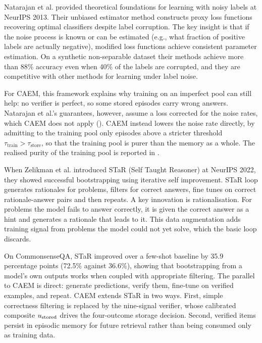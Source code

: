 Natarajan et al. \cite{natarajan2013learning} provided theoretical foundations for learning with noisy labels at NeurIPS 2013. Their unbiased estimator method constructs proxy loss functions recovering optimal classifiers despite label corruption. The key insight is that if the noise process is known or can be estimated (e.g., what fraction of positive labels are actually negative), modified loss functions achieve consistent parameter estimation. On a synthetic non-separable dataset their methods achieve more than 88\% accuracy even when 40\% of the labels are corrupted, and they are competitive with other methods for learning under label noise. 

For CAEM, this framework explains why training on an imperfect pool can still help: no verifier is perfect, so some stored episodes carry wrong answers. Natarajan et al.'s guarantees, however, assume a loss corrected for the noise rates, which CAEM does not apply (). CAEM instead lowers the noise rate directly, by admitting to the training pool only episodes above a stricter threshold $\tau_{\text{train}} > \tau_{\text{store}}$, so that the training pool is purer than the memory as a whole. The realised purity of the training pool is reported in .

When Zelikman et al. \cite{NEURIPS2022_639a9a17} introduced STaR (Self Taught Reasoner) at NeurIPS 2022, they showed successful bootstrapping using iterative self improvement. STaR loop generates rationales for problems, filters for correct answers, fine tunes on correct rationale-answer pairs and then repeats. A key innovation is rationalisation. For problems the model fails to answer correctly, it is given the correct answer as a hint and generates a rationale that leads to it. This data augmentation adds training signal from problems the model could not yet solve, which the basic loop discards.

On CommonsenseQA, STaR improved over a few-shot baseline by 35.9 percentage points (72.5\% against 36.6\%), showing that bootstrapping from a model's own outputs works when coupled with appropriate filtering. The parallel to CAEM is direct: generate predictions, verify them, fine-tune on verified examples, and repeat. CAEM extends STaR in two ways. First, simple correctness filtering is replaced by the nine-signal verifier, whose calibrated composite $u_{\text{stored}}$ drives the four-outcome storage decision. Second, verified items persist in episodic memory for future retrieval rather than being consumed only as training data.

